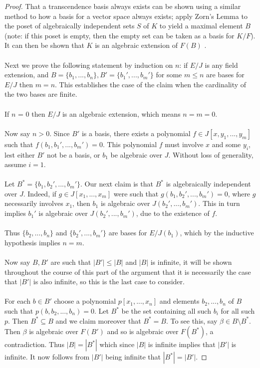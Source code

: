 \documentclass[12pt]{article}
\theoremstyle{plain}
\theoremstyle{definition}
\begin{document}
\begin{proof}
That a transcendence basis always exists can be shown using a similar method to how a basis for a vector space always exists; apply Zorn's Lemma to the poset of algebraically independent sets $S$ of $K$ to yield a maximal element $B$ (note: if this poset is empty, then the empty set can be taken as a basis for $K/F$). It can then be shown that $K$ is an algebraic extension of $F(B)$ \cite[\S 9.26]{stacksproject}.\\\\
%
Next we prove the following statement by induction on $n$: if $E/J$ is any field extension, and $B = \lbrace b_1,...,b_n\rbrace,B' = \lbrace b_1',...,b_m'\rbrace$ for some $m \leq n$ are bases for $E/J$ then $m=n$. This establishes the case of the claim when the cardinality of the two bases are finite.\\\\
%
If $n$ = 0 then $E/J$ is an algebraic extension, which means $n = m = 0$.\\\\
%
Now say $n > 0$. Since $B'$ is a basis, there exists a polynomial $f \in J[x,y_1,...,y_m]$ such that $f(b_1,b_1',...,b_m') = 0$. This polynomial $f$ must involve $x$ and some $y_i$, lest either $B'$ not be a basis, or $b_1$ be algebraic over $J$. Without loss of generality, assume $i = 1$.\\\\
%
Let $B^* = \lbrace b_1,b_2',...,b_m'\rbrace$. Our next claim is that $B^*$ is algebraically independent over $J$. Indeed, if $g \in J[x_1,...,x_m]$ were such that $g(b_1,b_2',...,b_m') = 0$, where $g$ necessarily involves $x_1$, then $b_1$ is algebraic over $J(b_2',...,b_m')$. This in turn implies $b_1'$ is algebraic over $J(b_2',...,b_m')$, due to the existence of $f$.\\\\
%
Thus $\lbrace b_2,...,b_n\rbrace$ and $\lbrace b_2',...,b_m'\rbrace$ are bases for $E/J(b_1)$, which by the inductive hypothesis implies $n = m$.\\\\
%
Now say $B,B'$ are such that $|B'| \leq |B|$ and $|B|$ is infinite, it will be shown throughout the course of this part of the argument that it is necessarily the case that $|B'|$ is also infinite, so this is the last case to consider.\\\\
%
For each $b \in B'$ choose a polynomial $p[x_1,...,x_n]$ and elements $b_2,...,b_n$ of $B$ such that $p(b,b_2,...,b_n) = 0$. Let $B^\ast$ be the set containing all such $b_i$ for all such $p$. Then $B^\ast \subseteq B$ and we claim moreover that $B^\ast = B$. To see this, say $\beta \in B\setminus B^\ast$. Then $\beta$ is algebraic over $F(B')$ and so is algebraic over $F(B^\ast)$, a contradiction. Thus $|B| = |B^\ast|$ which since $|B|$ is infinite implies that $|B'|$ is infinite. It now follows from $|B'|$ being infinite that $|B^*| = |B'|$.
\end{proof}
\end{document}
